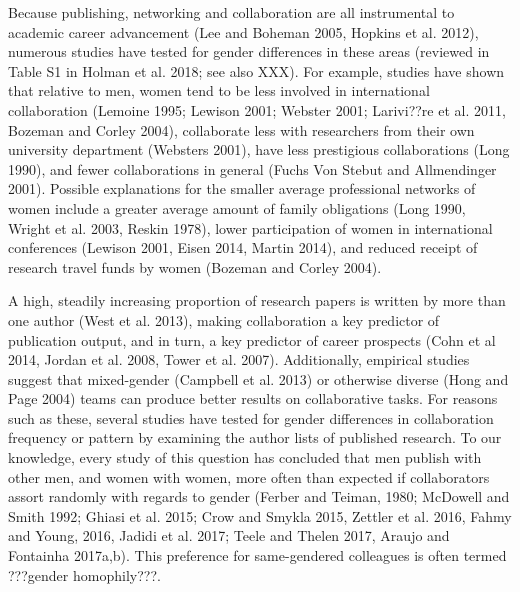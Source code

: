 \documentclass[12pt,]{article}
\begin{document}
Because publishing, networking and collaboration are all instrumental to
academic career advancement (Lee and Boheman 2005, Hopkins et al. 2012),
numerous studies have tested for gender differences in these areas
(reviewed in Table S1 in Holman et al. 2018; see also XXX). For example,
studies have shown that relative to men, women tend to be less involved
in international collaboration (Lemoine 1995; Lewison 2001; Webster
2001; Larivi??re et al. 2011, Bozeman and Corley 2004), collaborate less
with researchers from their own university department (Websters 2001),
have less prestigious collaborations (Long 1990), and fewer
collaborations in general (Fuchs Von Stebut and Allmendinger 2001).
Possible explanations for the smaller average professional networks of
women include a greater average amount of family obligations (Long 1990,
Wright et al. 2003, Reskin 1978), lower participation of women in
international conferences (Lewison 2001, Eisen 2014, Martin 2014), and
reduced receipt of research travel funds by women (Bozeman and Corley
2004).

A high, steadily increasing proportion of research papers is written by
more than one author (West et al. 2013), making collaboration a key
predictor of publication output, and in turn, a key predictor of career
prospects (Cohn et al 2014, Jordan et al. 2008, Tower et al. 2007).
Additionally, empirical studies suggest that mixed-gender (Campbell et
al. 2013) or otherwise diverse (Hong and Page 2004) teams can produce
better results on collaborative tasks. For reasons such as these,
several studies have tested for gender differences in collaboration
frequency or pattern by examining the author lists of published
research. To our knowledge, every study of this question has concluded
that men publish with other men, and women with women, more often than
expected if collaborators assort randomly with regards to gender (Ferber
and Teiman, 1980; McDowell and Smith 1992; Ghiasi et al. 2015; Crow and
Smykla 2015, Zettler et al. 2016, Fahmy and Young, 2016, Jadidi et al.
2017; Teele and Thelen 2017, Araujo and Fontainha 2017a,b). This
preference for same-gendered colleagues is often termed ???gender
homophily???.
\end{document}
